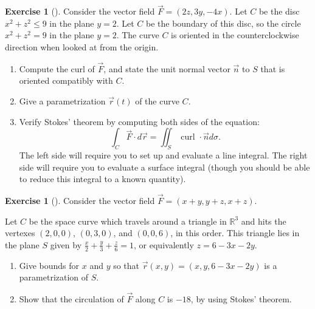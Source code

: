 \documentclass[10pt,]{book}
\theoremstyle{plain}
\theoremstyle{definition}
\theoremstyle{definition}
\theoremstyle{definition}
\theoremstyle{definition}
\newtheorem{exploration}[project]{Exercise}
\theoremstyle{definition}
\numberwithin{equation}{section}
\newcommand{\ds}{\displaystyle}
\begin{document}
\begin{exploration}[]\label{exploration-290}
Consider the vector field \(\vec F = (2z,3y,-4x)\). Let \(C\) be the disc \(x^2+z^2\leq 9\) in the plane \(y=2\). Let \(C\) be the boundary of this disc, so the circle \(x^2+z^2=9\) in the plane \(y=2\). The curve \(C\) is oriented in the counterclockwise direction when looked at from the origin.%
\begin{enumerate}[font=\bfseries,label=(\alph*),ref=\alph*]
\item\label{task-802} Compute the curl of \(\vec F\), and state the unit normal vector \(\vec n\) to \(S\) that is oriented compatibly with \(C\).%
\item\label{task-803} Give a parametrization \(\vec r(t)\) of the curve \(C\).%
\item\label{task-804} Verify Stokes' theorem by computing both sides of the equation:%
\begin{equation*}
\int_C\vec F\cdot d\vec r = \iint_S \text{ curl } \cdot \vec n d\sigma.
\end{equation*}
The left side will require you to set up and evaluate a line integral.  The right side will require you to evaluate a surface integral (though you should be able to reduce this integral to a known quantity).%
\end{enumerate}
\end{exploration}
\begin{exploration}[]\label{exploration-291}
Consider the vector field \(\vec F = \left(x+y, y+z, x+z\right)\).%
\par
Let \(C\) be the space curve which travels around a triangle in \(\mathbb{R}^3\) and hits the vertexes \((2,0,0)\), \((0,3,0)\), and \((0,0,6)\), in this order. This triangle lies in the plane \(S\) given by \(\ds \frac x2+\frac y3 +\frac z6=1\), or equivalently \(z=6-3x-2y\).%
\begin{enumerate}[font=\bfseries,label=(\alph*),ref=\alph*]
\item\label{task-805} Give bounds for \(x\) and \(y\) so that \(\vec r(x,y)=(x,y,6-3x-2y)\) is a parametrization of \(S\).%
\item\label{task-806} Show that the circulation of \(\vec F\) along \(C\) is \(-18\), by using Stokes' theorem.%
\end{enumerate}
\end{exploration}
\end{document}
